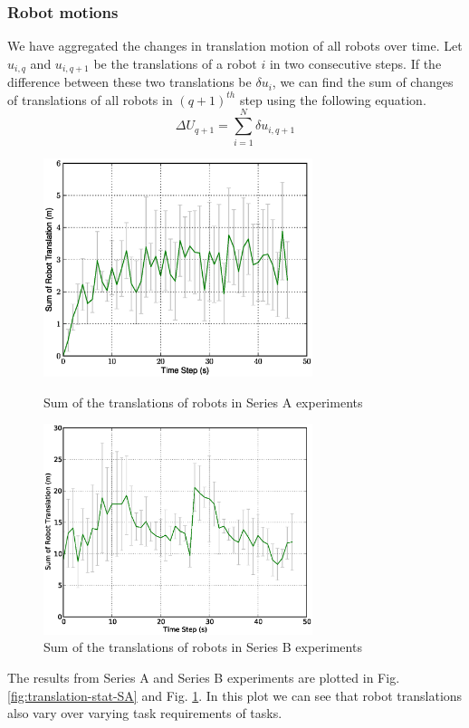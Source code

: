 \documentclass[smallcondensed]{svjour3}
\begin{document}
\subsubsection{Robot motions}
We have aggregated the changes in translation motion of all robots over time. Let $u_{i,q}$ and $u_{i,q+1}$ be the translations of a robot $i$ in two consecutive steps. If the difference between these two translations be $\delta u_{i}$, we can find the sum of changes of translations of all robots in $(q+1)^{th}$ step using the following equation.
\begin{equation}
\Delta U_{q+1} = \sum_{i=1}^{N} \delta u_{i, q+1} 
\label{eqn:Delta-Tr}
\end{equation}
\begin{figure}
\centering
\includegraphics[width=0.7\textwidth]{images/global-8robots/8robots-DeltaTranslationStat.eps}
\caption{\small Sum of the translations of robots in Series A experiments}
\label{fig:translation-stat-SA} %
\centering
\includegraphics[width=0.7\textwidth]{images/global/DeltaTranslationStat.eps}
\caption{\small Sum of the translations of robots in Series B experiments}
\label{fig:translation-stat-SB} %
\end{figure}
The results from Series A and Series B experiments are plotted in Fig. \ref{fig:translation-stat-SA} and Fig. \ref{fig:translation-stat-SB}. In this plot we can see that robot translations also vary over varying task requirements of tasks.
\end{document}
